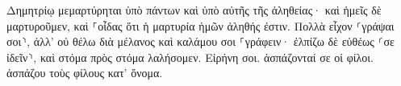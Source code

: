 \documentclass{openreader}
\begin{document}
Δημητρίῳ μεμαρτύρηται ὑπὸ πάντων καὶ ὑπὸ αὐτῆς τῆς ἀληθείας· καὶ ἡμεῖς δὲ μαρτυροῦμεν, καὶ ⸀οἶδας ὅτι ἡ μαρτυρία ἡμῶν ἀληθής ἐστιν. Πολλὰ εἶχον ⸂γράψαι σοι⸃, ἀλλ’ οὐ θέλω διὰ μέλανος καὶ καλάμου σοι ⸀γράφειν· ἐλπίζω δὲ εὐθέως ⸂σε ἰδεῖν⸃, καὶ στόμα πρὸς στόμα λαλήσομεν. Εἰρήνη σοι. ἀσπάζονταί σε οἱ φίλοι. ἀσπάζου τοὺς φίλους κατ’ ὄνομα. 
\end{document}
